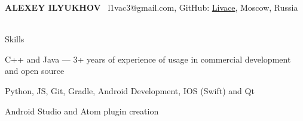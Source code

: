 \documentclass{resume} %
\begin{document}
{\color{meow}\MakeUppercase{\bf Alexey Ilyukhov}} \hfill ~l1vac3@gmail.com, GitHub: \href{https://github.com/livace}{\color{link}Livace}, Moscow, Russia \\
\\

\begin{rSection}{Skills}

    C++ and Java --- 3+ years of experience of usage in commercial development and open source
    \begin{itemize}\end{itemize} %
    Python, JS, Git, Gradle, Android Development, IOS (Swift) and Qt 
    \begin{itemize}\end{itemize} %
    Android Studio and Atom plugin creation

\end{rSection}
\end{document}
